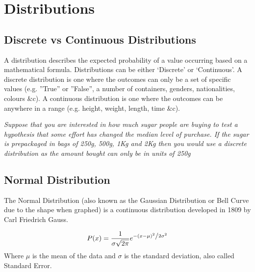 \chapter{Distributions}

\section{Discrete vs Continuous Distributions}
A distribution describes the expected probability of a value occurring based on a mathematical formula.  Distributions can be either `Discrete' or `Continuous'.  A discrete distribution is one where the outcomes can only be a set of specific values (e.g. ''True'' or ''False'', a number of containers, genders, nationalities, colours \&c).  A continuous distribution is one where the outcomes can be anywhere in a range (e.g. height, weight, length, time \&c).

\emph{Suppose that you are interested in how much sugar people are buying to test a hypothesis that some effort has changed the median level of purchase.  If the sugar is prepackaged in bags of 250g, 500g, 1Kg and 2Kg then you would use a discrete distribution as the amount bought can only be in units of 250g}

\section{Normal Distribution}
The Normal Distribution
(also known as the Gaussian Distribution  or 
Bell Curve due to the shape when graphed) is a continuous distribution developed in 1809 by Carl Friedrich Gauss.

\begin{equation}
    P(x) = \frac{1}{{\sigma \sqrt {2\pi } }}e^{{{ - \left( {x - \mu } \right)^2 } \mathord{\left/ {\vphantom {{ - \left( {x - \mu } \right)^2 } {2\sigma ^2 }}} \right. \kern-\nulldelimiterspace} {2\sigma ^2 }}}
\end{equation}
Where $\mu$  is the mean of the data and $\sigma$ is the standard deviation, also called Standard Error.

